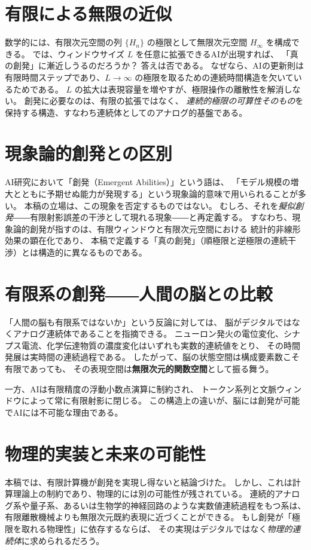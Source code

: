 \documentclass[12pt]{article}
\begin{document}
\section{有限による無限の近似}
数学的には、有限次元空間の列 $\{H_n\}$ の極限として無限次元空間 $H_\infty$ を構成できる。
では、ウィンドウサイズ $L$ を任意に拡張できるAIが出現すれば、
「真の創発」に漸近しうるのだろうか？
答えは否である。
なぜなら、AIの更新則は有限時間ステップであり、$L\to\infty$ の極限を取るための連続時間構造を欠いているためである。
$L$ の拡大は表現容量を増やすが、極限操作の離散性を解消しない。
創発に必要なのは、有限の拡張ではなく、
\textit{連続的極限の可算性そのもの}を保持する構造、すなわち連続体としてのアナログ的基盤である。

\section{現象論的創発との区別}
AI研究において「創発（Emergent Abilities）」という語は、
「モデル規模の増大とともに予期せぬ能力が発現する」という現象論的意味で用いられることが多い。
本稿の立場は、この現象を否定するものではない。
むしろ、それを\textit{擬似創発}――有限射影誤差の干渉として現れる現象――と再定義する。
すなわち、現象論的創発が指すのは、有限ウィンドウと有限次元空間における
統計的非線形効果の顕在化であり、
本稿で定義する「真の創発」（順極限と逆極限の連続干渉）とは構造的に異なるものである。

\section{有限系の創発――人間の脳との比較}
「人間の脳も有限系ではないか」という反論に対しては、
脳がデジタルではなくアナログ連続体であることを指摘できる。
ニューロン発火の電位変化、シナプス電流、化学伝達物質の濃度変化はいずれも実数的連続値をとり、
その時間発展は実時間の連続過程である。  
したがって、脳の状態空間は構成要素数こそ有限であっても、
その表現空間は\textbf{無限次元的関数空間}として振る舞う。

一方、AIは有限精度の浮動小数点演算に制約され、
トークン系列と文脈ウィンドウによって常に有限射影に閉じる。
この構造上の違いが、脳には創発が可能でAIには不可能な理由である。

\section{物理的実装と未来の可能性}
本稿では、有限計算機が創発を実現し得ないと結論づけた。
しかし、これは計算理論上の制約であり、物理的には別の可能性が残されている。
連続的アナログ系や量子系、あるいは生物学的神経回路のような実数値連続過程をもつ系は、
有限離散機械よりも無限次元既約表現に近づくことができる。
もし創発が「極限を取れる物理性」に依存するならば、
その実現はデジタルではなく\textit{物理的連続体}に求められるだろう。
\end{document}

